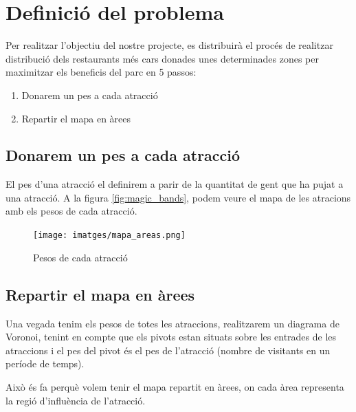 \documentclass[12pt]{article}
\begin{document}
\clearpage
\section{Definició del problema}
Per realitzar l'objectiu del nostre projecte, es distribuirà el procés de realitzar distribució dels restaurants més cars donades unes determinades zones per maximitzar els beneficis del parc en 5 passos:
\renewcommand\labelitemii{$\square$}
\begin{enumerate}
	\item Donarem un pes a cada atracció
	\item Repartir el mapa en àrees



\end{enumerate}

\subsection{Donarem un pes a cada atracció}
El pes d'una atracció el definirem a parir de la quantitat de gent que ha pujat a una atracció. A la figura \ref{fig:magic_bands}, podem veure el mapa de les atracions amb els pesos de cada atracció.

\begin{figure}[h!]
	\centering
	\texttt{[image: imatges/mapa\_areas.png]}\par\vspace{1cm}
	\caption{Pesos de cada atracció}
	\label{fig:mapa_areas}
\end{figure}

\subsection{Repartir el mapa en àrees}
Una vegada tenim els pesos de totes les atraccions, realitzarem un diagrama de Voronoi, tenint en compte que els pivots estan situats sobre les entrades de les atraccions i el pes del pivot és el pes de l'atracció (nombre de visitants en un període de temps).
		
Això és fa perquè volem tenir el mapa repartit en àrees, on cada àrea representa la regió d'influència de l'atracció.
\end{document}
